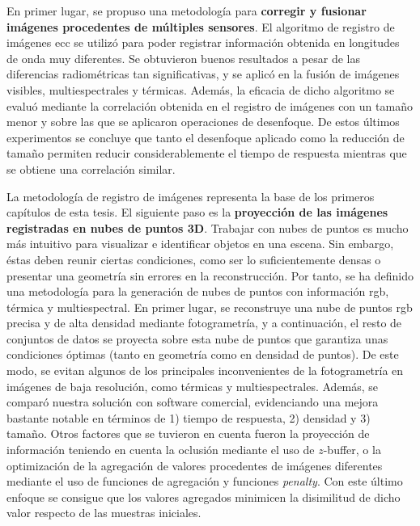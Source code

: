 En primer lugar, se propuso una metodología para \textbf{corregir y fusionar imágenes procedentes de múltiples sensores}. El algoritmo de registro de imágenes \acrshort{ecc} se utilizó para poder registrar información obtenida en longitudes de onda muy diferentes. Se obtuvieron buenos resultados a pesar de las diferencias radiométricas tan significativas, y se aplicó en la fusión de imágenes visibles, multiespectrales y térmicas. Además, la eficacia de dicho algoritmo se evaluó mediante la correlación obtenida en el registro de imágenes con un tamaño menor y sobre las que se aplicaron operaciones de desenfoque. De estos últimos experimentos se concluye que tanto el desenfoque aplicado como la reducción de tamaño permiten reducir considerablemente el tiempo de respuesta mientras que se obtiene una correlación similar.

La metodología de registro de imágenes representa la base de los primeros capítulos de esta tesis. El siguiente paso es la \textbf{proyección de las imágenes registradas en nubes de puntos 3D}. Trabajar con nubes de puntos es mucho más intuitivo para visualizar e identificar objetos en una escena. Sin embargo, éstas deben reunir ciertas condiciones, como ser lo suficientemente densas o presentar una geometría sin errores en la reconstrucción. Por tanto, se ha definido una metodología para la generación de nubes de puntos con información \acrshort{rgb}, térmica y multiespectral. En primer lugar, se reconstruye una nube de puntos \acrshort{rgb} precisa y de alta densidad mediante fotogrametría, y a continuación, el resto de conjuntos de datos se proyecta sobre esta nube de puntos que garantiza unas condiciones óptimas (tanto en geometría como en densidad de puntos). De este modo, se evitan algunos de los principales inconvenientes de la fotogrametría en imágenes de baja resolución, como térmicas y multiespectrales. Además, se comparó nuestra solución con software comercial, evidenciando una mejora bastante notable en términos de 1) tiempo de respuesta, 2) densidad y 3) tamaño. Otros factores que se tuvieron en cuenta fueron la proyección de información teniendo en cuenta la oclusión mediante el uso de $z$-buffer, o la optimización de la agregación de valores procedentes de imágenes diferentes mediante el uso de funciones de agregación y funciones \textit{penalty}. Con este último enfoque se consigue que los valores agregados minimicen la disimilitud de dicho valor respecto de las muestras iniciales. 

